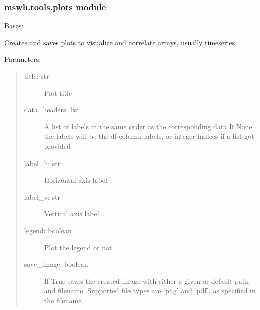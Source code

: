\documentclass[letterpaper,10pt,english,openany]{sphinxmanual}
\begin{document}
\subsubsection{mswh.tools.plots module}
\label{\detokenize{source/mswh.tools:module-mswh.tools.plots}}\label{\detokenize{source/mswh.tools:mswh-tools-plots-module}}

\begin{fulllineitems}
\label{\detokenize{source/mswh.tools:mswh.tools.plots.Plot}}
Bases: 

Creates and saves plots to visualize and
correlate arrays, usually timeseries

Parameters:
\begin{quote}
\begin{description}
\item[{title: str}] \leavevmode
Plot title

\item[{data\_headers: list}] \leavevmode
A list of labels in the same order as the corresponding data
If None the labels will be the df column labels, or integer
indices if a list got provided

\item[{label\_h: str}] \leavevmode
Horizontal axis label

\item[{label\_v: str}] \leavevmode
Vertical axis label

\item[{legend: boolean}] \leavevmode
Plot the legend or not

\item[{save\_image: boolean}] \leavevmode
If True saves the created image with either
a given or default path and filename. Supported
file types are ‘png’ and ‘pdf’, as specified in
the filename.


\end{description}
\end{quote}
\end{fulllineitems}
\end{document}
